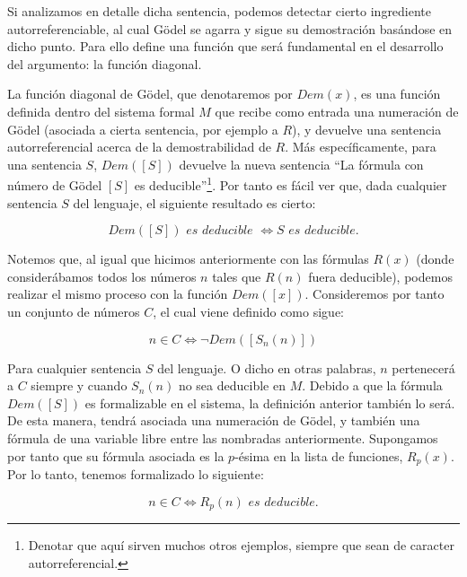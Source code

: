 Si analizamos en detalle dicha sentencia, podemos detectar cierto ingrediente autorreferenciable, al cual Gödel se agarra y sigue su demostración basándose en dicho punto. Para ello define una función que será fundamental en el desarrollo del argumento: la función diagonal.

La función diagonal de Gödel, que denotaremos por $Dem(x)$, es una función definida dentro del sistema formal $M$ que recibe como entrada una numeración de Gödel (asociada a cierta sentencia, por ejemplo a $R$), y devuelve una sentencia autorreferencial acerca de la demostrabilidad
de $R$. Más específicamente, para una sentencia $S$, $Dem([S])$ devuelve la nueva sentencia ``La fórmula con número de Gödel $[S]$ es deducible''\footnote{Denotar que aquí sirven muchos otros ejemplos, siempre que sean de caracter autorreferencial.}. Por tanto es 
fácil ver que, dada cualquier sentencia $S$ del lenguaje, el siguiente resultado es cierto:

\begin{equation}\label{th:Dev_Incom_I}
    Dem([S]) \textit{ es deducible } \Leftrightarrow S \textit{ es deducible.}
\end{equation}

Notemos que, al igual que hicimos anteriormente con las fórmulas $R(x)$ (donde considerábamos todos los números $n$ tales que $R(n)$ fuera deducible), podemos realizar el mismo proceso con la función $Dem([x])$. Consideremos por tanto un conjunto de números $C$, el cual viene
definido como sigue:

\begin{equation}\label{th:Dev_Incom_II}
    n \in C \Leftrightarrow \lnot Dem([S_n(n)])
\end{equation}

Para cualquier sentencia $S$ del lenguaje. O dicho en otras palabras, $n$ pertenecerá a $C$ siempre y cuando $S_n(n)$ no sea deducible en $M$. Debido a que la fórmula $Dem([S])$ es formalizable en el sistema, la definición anterior también lo será. De esta manera, tendrá asociada
una numeración de Gödel, y también una fórmula de una variable libre entre las nombradas anteriormente. Supongamos por tanto que su fórmula asociada es la $p$-ésima en la lista de funciones, $R_p(x)$. Por lo tanto, tenemos formalizado lo siguiente:

\begin{equation}\label{th:Dev_Incom_III}
    n \in C \Leftrightarrow R_p(n) \textit{ es deducible.}
\end{equation}

